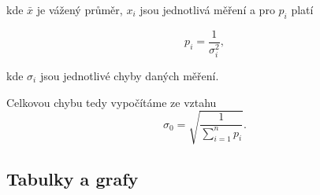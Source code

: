 \documentclass[english]{article}
\begin{document}
	kde $\bar{x}$ je vážený průměr, $x_{i}$ jsou jednotlivá měření a pro $p_{i}$ platí
	 
	\begin{equation}
	p_{i}=\frac{1}{\sigma_{i}^{2}},
	\end{equation}
	
	kde $\sigma_{i}$ jsou jednotlivé chyby daných měření.
	 
	Celkovou chybu tedy vypočítáme ze vztahu
	\begin{equation} \label{eq:vazeny_prumer}
	\sigma_{0}=\sqrt{\frac{1}{\sum\limits_{i=1}^{n}p_{i}}}.
	\end{equation}
%
%
	
\clearpage
\subsection{Tabulky a grafy}
\end{document}
